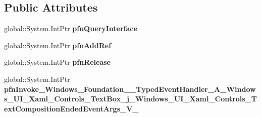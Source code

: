 \subsection*{Public Attributes}
\begin{DoxyCompactItemize}
\item 
\mbox{\label{struct_windows_1_1_foundation_1_1_typed_event_handler___a___windows___u_i___xaml___controls___te0b4df93de6e851b0934d485b06536178_a148f79bb395f46045cee6bf103921e79}} 
global\+::\+System.\+Int\+Ptr {\bfseries pfn\+Query\+Interface}
\item 
\mbox{\label{struct_windows_1_1_foundation_1_1_typed_event_handler___a___windows___u_i___xaml___controls___te0b4df93de6e851b0934d485b06536178_ad00283e8a2221d137b3b1ef4409d895e}} 
global\+::\+System.\+Int\+Ptr {\bfseries pfn\+Add\+Ref}
\item 
\mbox{\label{struct_windows_1_1_foundation_1_1_typed_event_handler___a___windows___u_i___xaml___controls___te0b4df93de6e851b0934d485b06536178_af184c565ae432c42757c8507cac8cee7}} 
global\+::\+System.\+Int\+Ptr {\bfseries pfn\+Release}
\item 
\mbox{\label{struct_windows_1_1_foundation_1_1_typed_event_handler___a___windows___u_i___xaml___controls___te0b4df93de6e851b0934d485b06536178_a505f4ecce181ecfce6e4ba4fb7c831bb}} 
global\+::\+System.\+Int\+Ptr {\bfseries pfn\+Invoke\+\_\+\+Windows\+\_\+\+Foundation\+\_\+\+\_\+\+Typed\+Event\+Handler\+\_\+\+A\+\_\+\+Windows\+\_\+\+U\+I\+\_\+\+Xaml\+\_\+\+Controls\+\_\+\+Text\+Box\+\_\+j\+\_\+\+Windows\+\_\+\+U\+I\+\_\+\+Xaml\+\_\+\+Controls\+\_\+\+Text\+Composition\+Ended\+Event\+Args\+\_\+\+V\+\_\+}
\end{DoxyCompactItemize}
